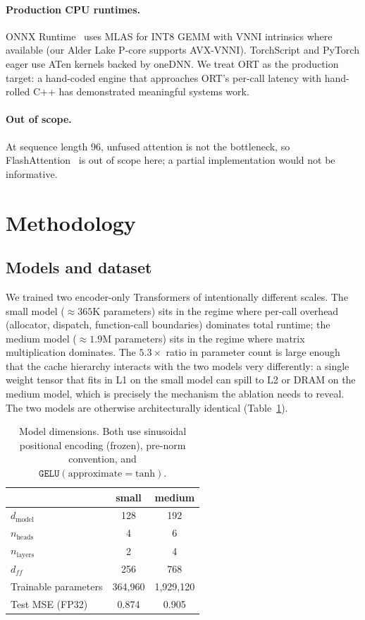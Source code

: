 \documentclass{article}
\begin{document}
\paragraph{Production CPU runtimes.}
ONNX Runtime~\citep{onnxruntime} uses MLAS for INT8 GEMM with VNNI intrinsics where available (our Alder Lake P-core supports AVX-VNNI).
TorchScript and PyTorch eager use ATen kernels backed by oneDNN.
We treat ORT as the production target: a hand-coded engine that approaches ORT's per-call latency with hand-rolled C++ has demonstrated meaningful systems work.

\paragraph{Out of scope.}
At sequence length 96, unfused attention is not the bottleneck, so FlashAttention~\citep{dao2022flashattention} is out of scope here; a partial implementation would not be informative.

\section{Methodology}
\label{sec:method}

\subsection{Models and dataset}
\label{sec:method:model}

We trained two encoder-only Transformers of intentionally different scales.
The small model ($\approx 365$K parameters) sits in the regime where per-call overhead (allocator, dispatch, function-call boundaries) dominates total runtime; the medium model ($\approx 1.9$M parameters) sits in the regime where matrix multiplication dominates.
The $5.3\times$ ratio in parameter count is large enough that the cache hierarchy interacts with the two models very differently: a single weight tensor that fits in L1 on the small model can spill to L2 or DRAM on the medium model, which is precisely the mechanism the ablation needs to reveal.
The two models are otherwise architecturally identical (Table~\ref{tab:models}).

\begin{table}[t]
\centering
\caption{Model dimensions. Both use sinusoidal positional encoding (frozen), pre-norm convention, and $\texttt{GELU}(\text{approximate}=\text{tanh})$.}
\label{tab:models}
\small
\begin{tabular}{lcc}
\toprule
 & small & medium \\
\midrule
$d_\text{model}$       & 128       & 192 \\
$n_\text{heads}$       & 4         & 6 \\
$n_\text{layers}$      & 2         & 4 \\
$d_{ff}$               & 256       & 768 \\
Trainable parameters   & 364{,}960 & 1{,}929{,}120 \\
Test MSE (FP32)        & 0.874     & 0.905 \\
\bottomrule
\end{tabular}
\end{table}
\end{document}
